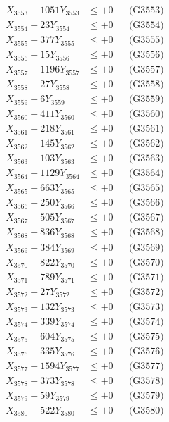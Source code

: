 \documentclass[a4paper,10pt]{article}
\begin{document}
{\begin{align}
X_{3553} - 1051Y_{3553} &\leq +0 && \text{(G3553)} \\
X_{3554} - 23Y_{3554} &\leq +0 && \text{(G3554)} \\
X_{3555} - 377Y_{3555} &\leq +0 && \text{(G3555)} \\
X_{3556} - 15Y_{3556} &\leq +0 && \text{(G3556)} \\
X_{3557} - 1196Y_{3557} &\leq +0 && \text{(G3557)} \\
X_{3558} - 27Y_{3558} &\leq +0 && \text{(G3558)} \\
X_{3559} - 6Y_{3559} &\leq +0 && \text{(G3559)} \\
X_{3560} - 411Y_{3560} &\leq +0 && \text{(G3560)} \\
\allowbreak
X_{3561} - 218Y_{3561} &\leq +0 && \text{(G3561)} \\
X_{3562} - 145Y_{3562} &\leq +0 && \text{(G3562)} \\
X_{3563} - 103Y_{3563} &\leq +0 && \text{(G3563)} \\
X_{3564} - 1129Y_{3564} &\leq +0 && \text{(G3564)} \\
X_{3565} - 663Y_{3565} &\leq +0 && \text{(G3565)} \\
X_{3566} - 250Y_{3566} &\leq +0 && \text{(G3566)} \\
X_{3567} - 505Y_{3567} &\leq +0 && \text{(G3567)} \\
X_{3568} - 836Y_{3568} &\leq +0 && \text{(G3568)} \\
X_{3569} - 384Y_{3569} &\leq +0 && \text{(G3569)} \\
X_{3570} - 822Y_{3570} &\leq +0 && \text{(G3570)} \\
\allowbreak
X_{3571} - 789Y_{3571} &\leq +0 && \text{(G3571)} \\
X_{3572} - 27Y_{3572} &\leq +0 && \text{(G3572)} \\
X_{3573} - 132Y_{3573} &\leq +0 && \text{(G3573)} \\
X_{3574} - 339Y_{3574} &\leq +0 && \text{(G3574)} \\
X_{3575} - 604Y_{3575} &\leq +0 && \text{(G3575)} \\
X_{3576} - 335Y_{3576} &\leq +0 && \text{(G3576)} \\
X_{3577} - 1594Y_{3577} &\leq +0 && \text{(G3577)} \\
X_{3578} - 373Y_{3578} &\leq +0 && \text{(G3578)} \\
X_{3579} - 59Y_{3579} &\leq +0 && \text{(G3579)} \\
X_{3580} - 522Y_{3580} &\leq +0 && \text{(G3580)} \\

\end{align}}
\end{document}
